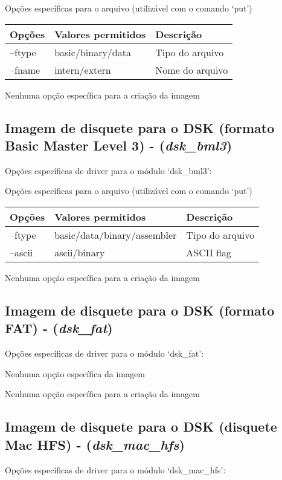 \documentclass[letterpaper,10pt,brazil]{sphinxmanual}
\begin{document}
Opções específicas para o arquivo (utilizável com o comando `put')

\noindent\begin{tabulary}{\linewidth}{|L|L|L|}
\hline

Opções
&
Valores permitidos
&
Descrição
\\
\hline
--ftype
&
basic/binary/data
&
Tipo do arquivo
\\
\hline
--fname
&
intern/extern
&
Nome do arquivo
\\
\hline\end{tabulary}


Nenhuma opção específica para a criação da imagem


\subsection{Imagem de disquete para o DSK (formato Basic Master Level 3) - (\emph{dsk\_bml3})}
\label{tools/imgtool:imagem-de-disquete-para-o-dsk-formato-basic-master-level-3-dsk-bml3}
Opções específicas de driver para o módulo `dsk\_bml3':

Opções específicas para o arquivo (utilizável com o comando `put')

\noindent\begin{tabulary}{\linewidth}{|L|L|L|}
\hline

Opções
&
Valores permitidos
&
Descrição
\\
\hline
--ftype
&
basic/data/binary/assembler
&
Tipo do arquivo
\\
\hline
--ascii
&
ascii/binary
&
ASCII flag
\\
\hline\end{tabulary}


Nenhuma opção específica para a criação da imagem


\subsection{Imagem de disquete para o DSK (formato FAT) - (\emph{dsk\_fat})}
\label{tools/imgtool:imagem-de-disquete-para-o-dsk-formato-fat-dsk-fat}
Opções específicas de driver para o módulo `dsk\_fat':

Nenhuma opção específica da imagem

Nenhuma opção específica para a criação da imagem


\subsection{Imagem de disquete para o DSK (disquete Mac HFS) - (\emph{dsk\_mac\_hfs})}
\label{tools/imgtool:imagem-de-disquete-para-o-dsk-disquete-mac-hfs-dsk-mac-hfs}
Opções específicas de driver para o módulo `dsk\_mac\_hfs':
\end{document}

